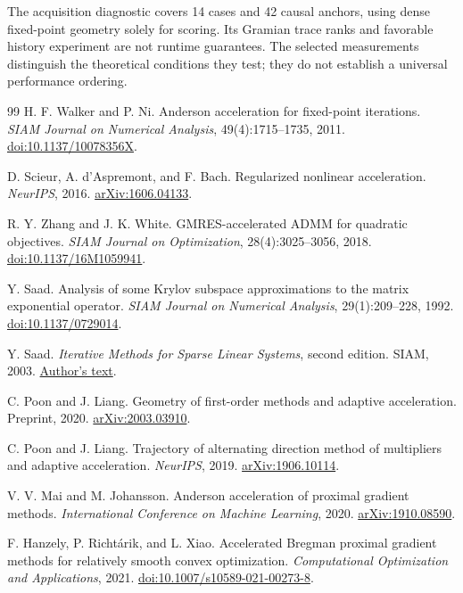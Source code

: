 \documentclass[journal]{IEEEtran}
\theoremstyle{definition}
\begin{document}
The acquisition diagnostic covers 14 cases and 42 causal anchors, using
dense fixed-point geometry solely for scoring. Its Gramian trace ranks
and favorable history experiment are not runtime guarantees. The selected
measurements distinguish the theoretical conditions they test; they do not
establish a universal performance ordering.
\begin{thebibliography}{99}
 H. F. Walker and P. Ni.
Anderson acceleration for fixed-point iterations.
\emph{SIAM Journal on Numerical Analysis}, 49(4):1715--1735, 2011.
\href{https://doi.org/10.1137/10078356X}{doi:10.1137/10078356X}.

 D. Scieur, A. d'Aspremont, and F. Bach.
Regularized nonlinear acceleration. \emph{NeurIPS}, 2016.
\href{https://arxiv.org/abs/1606.04133}{arXiv:1606.04133}.

 R. Y. Zhang and J. K. White.
GMRES-accelerated ADMM for quadratic objectives.
\emph{SIAM Journal on Optimization}, 28(4):3025--3056, 2018.
\href{https://doi.org/10.1137/16M1059941}{doi:10.1137/16M1059941}.

 Y. Saad.
Analysis of some Krylov subspace approximations to the matrix exponential operator.
\emph{SIAM Journal on Numerical Analysis}, 29(1):209--228, 1992.
\href{https://doi.org/10.1137/0729014}{doi:10.1137/0729014}.

 Y. Saad.
\emph{Iterative Methods for Sparse Linear Systems}, second edition.
SIAM, 2003.
\href{https://www-users.cse.umn.edu/~saad/IterMethBook_2ndEd.pdf}{Author's text}.

 C. Poon and J. Liang.
Geometry of first-order methods and adaptive acceleration.
Preprint, 2020.
\href{https://arxiv.org/abs/2003.03910}{arXiv:2003.03910}.

 C. Poon and J. Liang.
Trajectory of alternating direction method of multipliers and adaptive acceleration.
\emph{NeurIPS}, 2019.
\href{https://arxiv.org/abs/1906.10114}{arXiv:1906.10114}.

 V. V. Mai and M. Johansson.
Anderson acceleration of proximal gradient methods.
\emph{International Conference on Machine Learning}, 2020.
\href{https://arxiv.org/abs/1910.08590}{arXiv:1910.08590}.

 F. Hanzely, P. Richt\'arik, and L. Xiao.
Accelerated Bregman proximal gradient methods for relatively smooth convex optimization.
\emph{Computational Optimization and Applications}, 2021.
\href{https://doi.org/10.1007/s10589-021-00273-8}{doi:10.1007/s10589-021-00273-8}.


\end{thebibliography}
\end{document}

